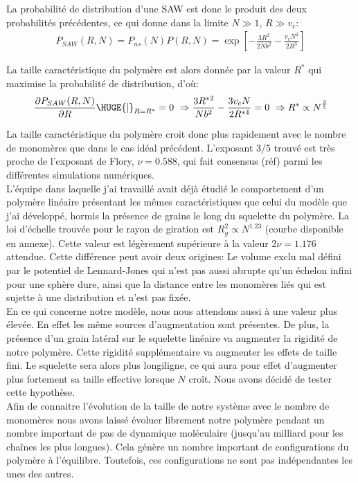 \documentclass[a4paper,11pt]{article}
\begin{document}
La probabilité de distribution d'une SAW est donc le produit des deux probabilités précédentes, ce qui donne dans la limite $N \gg 1$, $R \gg v_c$:
\begin{eqnarray}
P_{SAW}(R,N)=P_{ns}(N) P(R,N)=\exp\left[-\frac{3R^2}{2 N b^2}-\frac{v_cN^2}{2R^3}\right]
\end{eqnarray}

La taille caractéristique du polymère est alors donnée par la valeur $R^*$ qui maximise la probabilité de distribution, d'où:
\begin{eqnarray}
\frac{\partial P_{SAW}(R,N)}{\partial R}\HUGE{|} _{R=R^*}=0 \text{ }\Rightarrow \frac{3R^{*2}}{Nb^2}-\frac{3v_cN}{2R^{*4}} =0  \text{ }\Rightarrow R^* \propto N^\frac{3}{5}
\end{eqnarray}


La taille caractéristique du polymère croit donc plus rapidement avec le nombre de monomères que dans le cas idéal précédent. L'exposant 3/5 trouvé est très proche de l'exposant de Flory, $\nu=0.588$, qui fait consensus (réf) parmi les différentes simulations numériques. \\

L'équipe dans laquelle j'ai travaillé avait déjà étudié le comportement d'un polymère linéaire présentant les mêmes caractéristiques que celui du modèle que j'ai développé, hormis la présence de grains le long du squelette du polymère.
La loi d'échelle trouvée pour le rayon de giration est $R_g^2 \propto N^{1.23}$ (courbe disponible en annexe). Cette valeur est légèrement supérieure à la valeur $2\nu=1.176$ attendue. Cette différence peut avoir deux origines: Le volume exclu mal défini par le potentiel de Lennard-Jones qui n'est pas aussi abrupte qu'un échelon infini pour une sphère dure, ainsi que la distance entre les monomères liés qui est sujette à une distribution et n'est pas fixée.\\

En ce qui concerne notre modèle, nous nous attendons aussi à une valeur plus élevée. En effet les même sources d'augmentation sont présentes. De plus, la présence d'un grain latéral sur le squelette linéaire va augmenter la rigidité de notre polymère. Cette rigidité supplémentaire va augmenter les effets de taille fini. Le squelette sera alors plus longiligne, ce qui aura pour effet d'augmenter plus fortement sa taille effective lorsque $N$ croît. Nous avons décidé de tester cette hypothèse.\\

Afin de connaitre l'évolution de la taille de notre système avec le nombre de monomères nous avons laissé évoluer librement notre polymère pendant un nombre important de pas de dynamique moléculaire (jusqu'au milliard pour les chaînes les plus longues). Cela génère un nombre important de configurations du polymère à l'équilibre. Toutefois, ces configurations ne sont pas indépendantes les unes des autres.\\
\end{document}
